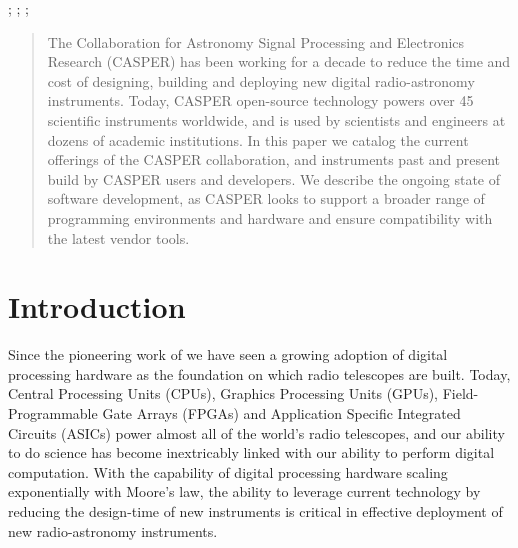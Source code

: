 \documentclass{ws-jai}
\begin{document}
\maketitle
{}


\begin{history} ; ; ;
\end{history}

\begin{abstract}

The Collaboration for Astronomy Signal Processing and Electronics Research
(CASPER) has been working for a decade to reduce the time and cost of
designing, building and deploying new digital radio-astronomy instruments.
Today, CASPER open-source technology powers over 45 scientific instruments
worldwide, and is used by scientists and engineers at dozens of academic
institutions.  In this paper we catalog the current offerings of the CASPER
collaboration, and instruments past and present build by CASPER users and developers.
We describe the ongoing state of software development, as CASPER looks to
support a broader range of programming environments and hardware and ensure compatibility
with the latest vendor tools.

\end{abstract}


\section{Introduction}\label{sec:introduction}

Since the pioneering work of \citet{Weinreb} we
have seen a growing adoption of digital processing hardware as the foundation
on which radio telescopes are built.  Today, Central Processing Units (CPUs), Graphics Processing Units (GPUs), Field-Programmable Gate Arrays (FPGAs) and Application Specific Integrated Circuits (ASICs) power
almost all of the world's radio telescopes, and our ability to do science has
become inextricably linked with our ability to perform digital computation.
With the capability of digital processing hardware scaling exponentially with
Moore's law, the ability to leverage current technology by reducing the
design-time of new instruments is critical in effective deployment of new
radio-astronomy instruments.
\end{document}
